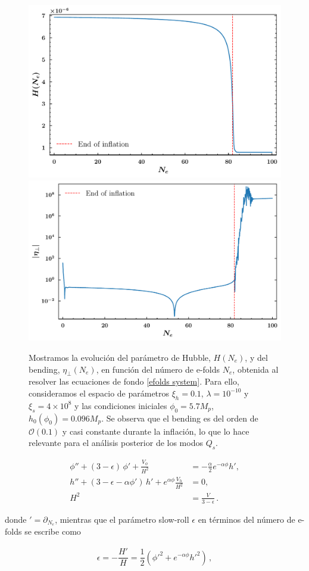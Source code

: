 \documentclass[12pt,a4paper,english,nofootinbib]{revtex4}
\newcommand{\beq}{\begin{eqnarray}}
\newcommand{\enq}{\end{eqnarray}}
\begin{document}
\begin{figure}[htp]
     \centering
     \includegraphics[width = 0.48 \textwidth]{Figures/hubbleparameter1.pdf}
     \quad
     \includegraphics[width = 0.48 \textwidth]{Figures/bending1.pdf}
     \caption{Mostramos la evolución del parámetro de Hubble, $H(N_e)$, y del bending, $\eta_\perp(N_e)$, en función del número de e-folds $N_e$, obtenida al resolver las ecuaciones de fondo \eqref{efolds system}. Para ello, consideramos el espacio de parámetros $\xi_h = 0.1$, $\lambda = 10^{-10}$ y $\xi_s = 4\times10^8$ y las condiciones iniciales $\phi_0 = 5.7 M_p$, $h_0(\phi_0) = 0.096 M_p$. Se observa que el bending es del orden de $\mathcal{O}(0.1)$ y casi constante durante la inflación, lo que lo hace relevante para el análisis posterior de los modos $Q_s$.
     }
     \label{Fig2}
\end{figure}



\begin{align}
    \phi'' + (3-\epsilon)\,\phi' + \frac{V_\phi}{H^2} &= -\frac{\alpha}{2} e^{-\alpha\phi} h',\nonumber\\[0.3cm]
    h'' + (3-\epsilon-\alpha\phi')\,h' + e^{\alpha\phi}\frac{V_h}{H^2} &= 0,\nonumber\\[0.3cm]
    H^2 &= \frac{V}{3-\epsilon}\,.
    \label{efolds system}
\end{align}

donde $' = \partial_{N_e}$, mientras que el parámetro slow-roll $\epsilon$ en términos del número de e-folds se escribe como 

\beq 
    \epsilon = - \dfrac{H'}{H} = \dfrac{1}{2}(\phi'^2 + e^{-\alpha\phi}h'^2)\,,
    \label{efolds SR}
\enq
\end{document}
